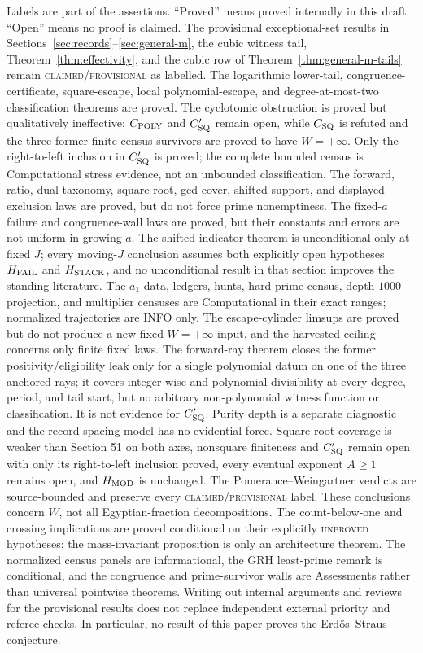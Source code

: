 \documentclass[10pt,reqno]{amsart}
\theoremstyle{definition}
\newcommand{\1}{\mathbf 1}
\begin{document}
Labels are part of the assertions.  ``Proved'' means proved internally in
this draft.  ``Open'' means no proof is claimed.  The provisional exceptional-set results in
Sections~\ref{sec:records}--\ref{sec:general-m}, the cubic witness tail,
Theorem~\ref{thm:effectivity}, and the cubic row of
Theorem~\ref{thm:general-m-tails} remain \textsc{claimed/provisional} as
labelled.  The logarithmic lower-tail, congruence-certificate, square-escape, local
polynomial-escape, and degree-at-most-two classification theorems are proved.
The cyclotomic obstruction is proved but qualitatively ineffective;
$C_{\rm POLY}$ and $C_{\rm SQ}'$ remain open, while $C_{\rm SQ}$ is refuted
and the three former finite-census survivors are proved to have
$W=+\infty$.  Only the right-to-left inclusion in $C_{\rm SQ}'$ is proved;
the complete bounded census is Computational stress evidence, not an
unbounded classification.  The forward, ratio, dual-taxonomy, square-root, gcd-cover, shifted-support,
and displayed exclusion laws are proved, but do not force prime
nonemptiness.  The fixed-$a$ failure and congruence-wall laws are proved,
but their constants and errors are not uniform in growing $a$.  The
shifted-indicator theorem is unconditional only at fixed $J$; every moving-$J$
conclusion assumes both explicitly open hypotheses $H_{\rm FAIL}$ and
$H_{\rm STACK}$, and no unconditional result in that section improves the
standing literature.  The $a_1$ data, ledgers, hunts, hard-prime census,
depth-$1000$ projection,
and multiplier censuses are Computational in their exact ranges; normalized
trajectories are INFO only.  The escape-cylinder limsups are proved but do
not produce a new fixed $W=+\infty$ input, and the harvested ceiling concerns
only finite fixed laws.  The forward-ray theorem closes the former
positivity/eligibility leak only for a single polynomial datum on one of the
three anchored rays; it covers integer-wise and polynomial divisibility at
every degree, period, and tail start, but no arbitrary non-polynomial
witness function or classification.  It is not evidence for
$C_{\rm SQ}'$.  Purity depth is a
separate diagnostic and the record-spacing model has no evidential force.
Square-root coverage is weaker than Section 51 on both axes, nonsquare
finiteness and $C_{\rm SQ}'$ remain open with only its right-to-left
inclusion proved, every eventual exponent $A\geq1$ remains open, and
$H_{\rm MOD}$ is unchanged.  The Pomerance--Weingartner verdicts are
source-bounded and preserve every \textsc{claimed/provisional} label.  These
conclusions concern $W$, not all Egyptian-fraction decompositions.  The count-below-one and crossing
implications are proved
conditional on their explicitly \textsc{unproved} hypotheses; the
mass-invariant proposition is only an architecture theorem.  The normalized
census panels are informational, the GRH least-prime remark is conditional,
and the congruence and prime-survivor walls are Assessments rather than
universal pointwise theorems.  Writing
out internal arguments and reviews for the provisional results does not
replace independent external priority and referee checks.  In
particular, no result of this paper proves the
Erd\H{o}s--Straus conjecture.
\end{document}
